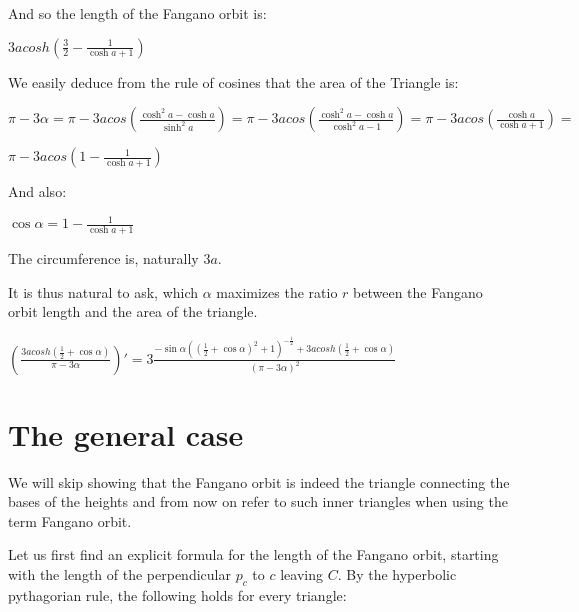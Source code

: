 \documentclass[a4paper,10pt]{article}
\begin{document}
And so the length of the Fangano orbit is:

\begin{center}
$ 3acosh\left(\frac{3}{2} - \frac{1}{\cosh{a} + 1}\right)$
\end{center}

We easily deduce from the rule of cosines that the area of the Triangle is:


$ \pi - 3\alpha = \pi - 3acos\left(\frac{\cosh^2{a} - \cosh{a}}{\sinh^2{a}}\right) = \pi - 3acos\left(\frac{\cosh^2{a} - \cosh{a}}{\cosh^2{a} - 1}\right) = \pi - 3acos\left(\frac{\cosh{a}}{\cosh{a} + 1}\right) = $

\begin{center}

$ \pi - 3acos\left(1 - \frac{1}{\cosh{a} + 1}\right) $
\end{center}

And also:

\begin{center}

$ \cos{\alpha} = 1 - \frac{1}{\cosh{a}+1} $
\end{center}

The circumference is, naturally $3a$.


It is thus natural to ask, which $\alpha$ maximizes the ratio $r$ between the
Fangano orbit length and the area of the triangle.
\begin {center}

$\left(\frac{  3acosh\left(\frac{1}{2} + \cos{\alpha} \right)}{\pi - 3\alpha} \right)' = 3\frac{-\sin{\alpha}\left(\left(\frac{1}{2}  +\cos{\alpha}\right)^2 + 1\right)^{-\frac{1}{2}} +3acosh\left(\frac{1}{2}+\cos{\alpha}\right) }{\left( \pi-3\alpha \right)^2}$

\end{center}




\section{The general case}

We will skip showing that the Fangano orbit is indeed the triangle connecting the
bases of the heights and from now on refer to such inner triangles when using the
term Fangano orbit.

Let us first find an explicit formula for the length of the Fangano orbit,
starting with the length of the perpendicular $p_c$ to $c$ leaving $C$.
By the hyperbolic pythagorian rule, the following holds for every triangle:
\end{document}
